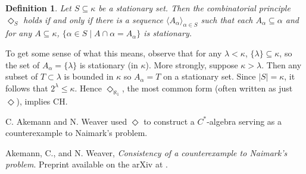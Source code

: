\documentclass[12pt]{article}
\newtheorem{defn}{Definition}
\begin{document}
\begin{defn}
Let $S\subseteq\kappa$ be a stationary set.  Then the combinatorial principle $\Diamond_S$ holds if and only if there is a sequence $\langle A_{\alpha}\rangle_{\alpha\in S}$ such that each $A_{\alpha}\subseteq\alpha$ and for any $A\subseteq\kappa$, $\{\alpha\in S\mid A\cap\alpha=A_{\alpha}\}$ is stationary.
\end{defn}


To get some sense of what this means, observe that for any $\lambda<\kappa$, $\{\lambda\}\subseteq\kappa$, so the set of $A_\alpha=\{\lambda\}$ is stationary (in $\kappa$).  More strongly, suppose $\kappa>\lambda$.  Then any subset of $T\subset\lambda$ is bounded in $\kappa$ so $A_\alpha=T$ on a stationary set.  Since $|S|=\kappa$, it follows that $2^\lambda\leq\kappa$.  Hence $\Diamond_{\aleph_1}$, the most common form (often written as just $\Diamond$), implies CH.

C. Akemann and N. Weaver used $\Diamond$ to construct a $C^*$-algebra serving as a counterexample to Naimark's problem.

\begin{thebibliography}{9}
Akemann, C., and N. Weaver, {\it Consistency of a counterexample to Naimark's problem}.  Preprint available on the arXiv at .
\end{thebibliography}
\end{document}
